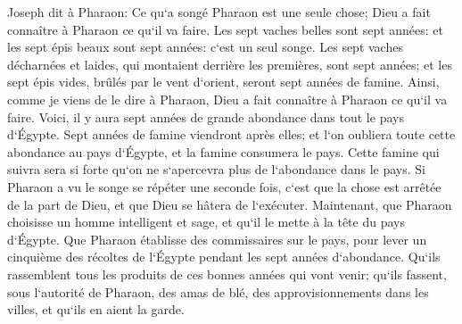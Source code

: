 \verse Joseph dit à Pharaon: Ce qu`a songé Pharaon est une seule chose; Dieu a fait connaître à Pharaon ce qu`il va faire. 
\verse Les sept vaches belles sont sept années: et les sept épis beaux sont sept années: c`est un seul songe. 
\verse Les sept vaches décharnées et laides, qui montaient derrière les premières, sont sept années; et les sept épis vides, brûlés par le vent d`orient, seront sept années de famine. 
\verse Ainsi, comme je viens de le dire à Pharaon, Dieu a fait connaître à Pharaon ce qu`il va faire. 
\verse Voici, il y aura sept années de grande abondance dans tout le pays d`Égypte. 
\verse Sept années de famine viendront après elles; et l`on oubliera toute cette abondance au pays d`Égypte, et la famine consumera le pays. 
\verse Cette famine qui suivra sera si forte qu`on ne s`apercevra plus de l`abondance dans le pays. 
\verse Si Pharaon a vu le songe se répéter une seconde fois, c`est que la chose est arrêtée de la part de Dieu, et que Dieu se hâtera de l`exécuter. 
\verse Maintenant, que Pharaon choisisse un homme intelligent et sage, et qu`il le mette à la tête du pays d`Égypte. 
\verse Que Pharaon établisse des commissaires sur le pays, pour lever un cinquième des récoltes de l`Égypte pendant les sept années d`abondance. 
\verse Qu`ils rassemblent tous les produits de ces bonnes années qui vont venir; qu`ils fassent, sous l`autorité de Pharaon, des amas de blé, des approvisionnements dans les villes, et qu`ils en aient la garde. 
